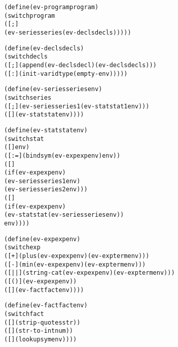 

\begin{alltt}
(define (ev-program program)
  (switch program
   ([\Begin \Declare {};  \End]
    (ev-series series (ev-decls decls)))))

(define (ev-decls decls)
  (switch decls
   ([ ; ] (append (ev-decls decl) (ev-decls decls)))
   ([ : ] (init-var id type (empty-env)))))

(define (ev-series series env)
   (switch series
    ([ ; ] (ev-series series1 (ev-stat stat1 env)))
    ([] (ev-stat stat env))))

(define (ev-stat stat env)
  (switch stat
    ([\Skip] env)
    ([ := ] (bind sym (ev-exp exp env) env))
    ([\If {} \Then {} \Else {} \Fi]
     (if (ev-exp exp env) 
        (ev-series series1 env)
        (ev-series series2 env)))
    ([\While {} \Do {} \Od]
     (if (ev-exp exp env) 
       (ev-stat stat (ev-series series env))
       env)))) 


(define (ev-exp exp env)
  (switch exp
    ([ + ] (plus (ev-exp exp env) (ev-exp term env)))
    ([ - ] (min (ev-exp exp env) (ev-exp term env)))
    ([ || ] (string-cat (ev-exp exp env) (ev-exp term env)))
    ([(  )] (ev-exp exp env))
    ([] (ev-fact fact env))))

(define (ev-fact fact env)
  (switch fact
    ([] (strip-quotes str))
    ([] (str-to-int num))
    ([] (lookup sym env))))
    
\end{alltt}
